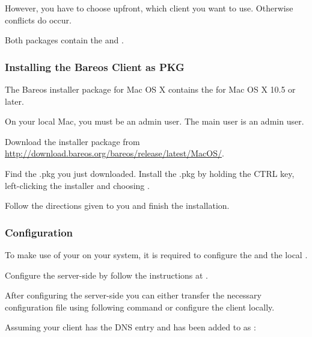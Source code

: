 However, you have to choose upfront, which client you want to use. Otherwise conflicts do occur.

Both packages contain the \bareosFd and .

%

\subsubsection{Installing the Bareos Client as PKG}

The Bareos installer package for Mac OS X contains the \bareosFd for Mac OS X 10.5 or later.

On your local Mac, you must be an admin user. The main user is an admin user.

Download the  installer package from \url{http://download.bareos.org/bareos/release/latest/MacOS/}.

Find the .pkg you just downloaded.
Install the .pkg by holding the CTRL key, left-clicking the installer and choosing .

Follow the directions given to you and finish the installation.

\subsubsection{Configuration}

To make use of your \bareosFd on your system, it is required to configure the \bareosDir and the local \bareosFd.

Configure the server-side by follow the instructions at .

After configuring the server-side you can either
transfer the necessary configuration file using following command
or configure the client locally.



Assuming your client has the DNS entry
 and has been added to \bareosDir as :

